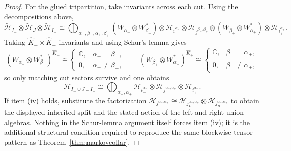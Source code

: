 \documentclass[11pt]{article}
\begin{document}
\begin{proof}
For the glued tripartition, take invariants across each cut. Using the decompositions above,
\[
\tilde{\mathcal H}_{I_-}\otimes \tilde{\mathcal H}_{J}\otimes \tilde{\mathcal H}_{I_+}
\cong
\bigoplus_{\alpha_-,\beta_-,\alpha_+,\beta_+}
(W_{\alpha_-}\otimes W_{\beta_-}^{*})
\otimes
\mathcal H_{i_-^{\alpha_-}}
\otimes
\mathcal H_{j^{\beta_-,\beta_+}}
\otimes
(W_{\beta_+}\otimes W_{\alpha_+}^{*})
\otimes
\mathcal H_{i_+^{\alpha_+}}.
\]
Taking \(\widehat K_-\times\widehat K_+\)-invariants and using Schur's lemma gives
\[
(W_{\alpha_-}\otimes W_{\beta_-}^{*})^{\widehat K_-}
\cong
\begin{cases}
\mathbb C, & \alpha_-=\beta_-,\\
0, & \alpha_-\neq \beta_-,
\end{cases}
\qquad
(W_{\beta_+}\otimes W_{\alpha_+}^{*})^{\widehat K_+}
\cong
\begin{cases}
\mathbb C, & \beta_+=\alpha_+,\\
0, & \beta_+\neq \alpha_+,
\end{cases}
\]
so only matching cut sectors survive and one obtains
\[
\mathcal H_{I_-\cup J\cup I_+}
\cong
\bigoplus_{\alpha_-,\alpha_+}
\mathcal H_{i_-^{\alpha_-}}\otimes
\mathcal H_{j^{\alpha_-,\alpha_+}}\otimes
\mathcal H_{i_+^{\alpha_+}}.
\]
If item (iv) holds, substitute the factorization
\(\mathcal H_{j^{\alpha_-,\alpha_+}}
\cong
\mathcal H_{j_L^{\alpha_-,\alpha_+}}\otimes
\mathcal H_{j_R^{\alpha_-,\alpha_+}}\)
to obtain the displayed inherited split and the stated action of the left and right union algebras. Nothing in the Schur-lemma argument itself forces item (iv); it is the additional structural condition required to reproduce the same blockwise tensor pattern as Theorem~\ref{thm:markovcollar}.
\end{proof}
\end{document}
